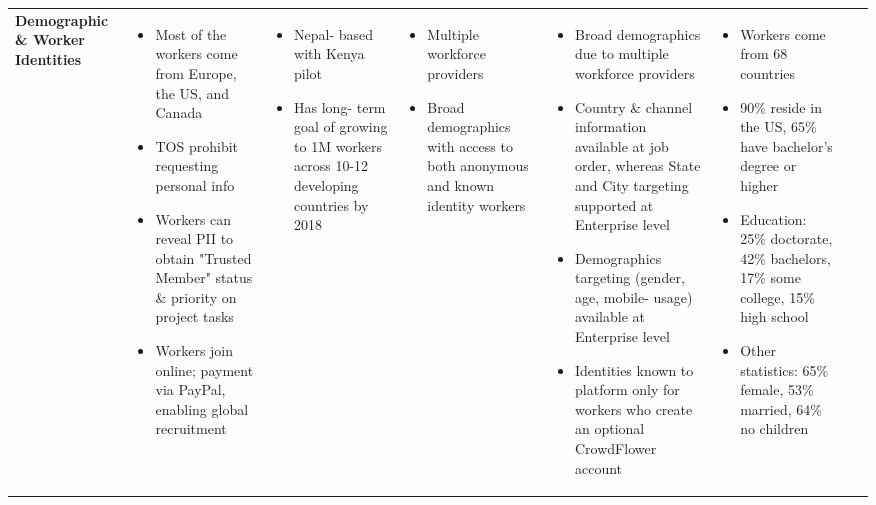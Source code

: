 \documentclass{sigchi}
\begin{document}
\begin{sidewaystable*}
\begin{tabular}[h]{| p{1.5cm}| p{2.7cm}| p{2.7cm}| p{2.7cm}| p{2.7cm}| p{2.7cm}| p{2.7cm}| p{2.7cm}|}
{\bf Demographic \& Worker Identities
} & 
{
\begin{itemize} [noitemsep,nolistsep]
\item  Most of the workers come from Europe, the US, and Canada
\item  TOS prohibit requesting personal info
\item  Workers can reveal PII to obtain "Trusted Member" status \& priority on project tasks
\item  Workers join online; payment via PayPal, enabling global recruitment
\end{itemize}
} &
{
\begin{itemize} [noitemsep,nolistsep]
\item  Nepal- based with Kenya pilot
\item  Has long- term goal of growing to 1M workers across 10-12 developing countries by 2018
\end{itemize}
} &
{
\begin{itemize} [noitemsep,nolistsep]
\item  Multiple workforce providers
\item  Broad demographics with access to both anonymous and known identity workers
\end{itemize}
} &
{
\begin{itemize} [noitemsep,nolistsep]
\item  Broad demographics due to multiple workforce providers
\item  Country \& channel information available at job order, whereas State and City targeting supported at Enterprise level
\item  Demographics targeting (gender, age, mobile- usage) available at Enterprise level
\item  Identities known to platform only for workers who create an optional CrowdFlower account
\end{itemize}
} &
{
\begin{itemize} [noitemsep,nolistsep]
\item  Workers come from 68 countries
\item  90\% reside in the US, 65\% have bachelor's degree or higher
\item  Education: 25\% doctorate, 42\% bachelors, 17\% some college, 15\% high school
\item  Other statistics: 65\% female, 53\% married, 64\% no children
\end{itemize}
} &
{
\begin{itemize} 

\end{itemize}}
\end{tabular}
\end{sidewaystable*}
\end{document}
